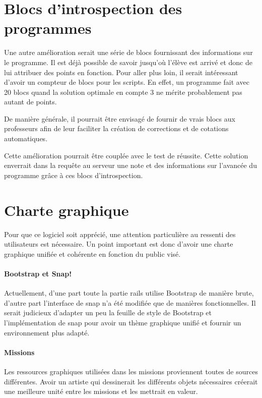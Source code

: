 \section{Blocs d'introspection des programmes}
Une autre amélioration serait une série de \glspl{bloc}  fournissant des informations sur le programme. Il est déjà possible de savoir jusqu'où l'élève est arrivé et donc de lui attribuer des points en fonction.
Pour aller plus loin, il serait intéressant d'avoir un compteur de \glspl{bloc}  pour les \glspl{script}. En effet, un programme fait avec 20 \glspl{bloc}  quand la solution optimale en compte 3 ne mérite probablement pas autant de points.

De manière générale, il pourrait être envisagé de fournir de vrais \glspl{bloc}  aux professeurs afin de leur faciliter la création de corrections et de cotations automatiques.

Cette amélioration pourrait être couplée avec le test de réussite. Cette solution enverrait dans la requête au serveur une note et des informations sur l'avancée du programme grâce à ces \glspl{bloc}  d'introspection.

\section{Charte graphique}
Pour que ce logiciel soit apprécié, une attention particulière au ressenti des utilisateurs est nécessaire. Un point important est donc d'avoir une charte graphique unifiée et cohérente en fonction du public visé.

\paragraph{Bootstrap et Snap!}
Actuellement, d'une part toute la partie \gls{rails} utilise Bootstrap de manière brute, d'autre part l'interface de \gls{snap} n'a été modifiée que de manières fonctionnelles. Il serait judicieux d'adapter un peu la feuille de style de Bootstrap et l'implémentation de \gls{snap} pour avoir un thème graphique unifié et fournir un environnement plus adapté.

\paragraph{Missions}
Les ressources graphiques utilisées dans les \glspl{mission} proviennent toutes de sources différentes. Avoir un artiste qui dessinerait les différents objets nécessaires créerait une meilleure unité entre les \glspl{mission} et les mettrait en valeur.

